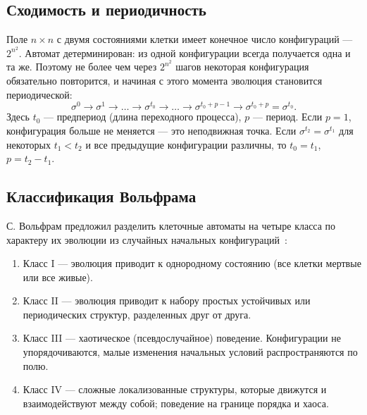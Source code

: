 \subsection{Сходимость и периодичность}
\label{sec:period}

Поле $n \times n$ с двумя состояниями клетки имеет конечное число конфигураций --- $2^{n^2}$. Автомат детерминирован: из одной конфигурации всегда получается одна и та же. Поэтому не более чем через $2^{n^2}$ шагов некоторая конфигурация обязательно повторится, и начиная с этого момента эволюция становится периодической:
\[
	\sigma^0 \to \sigma^1 \to \dots \to \sigma^{t_0} \to \dots \to \sigma^{t_0 + p - 1} \to \sigma^{t_0 + p} = \sigma^{t_0}.
\]
Здесь $t_0$ --- предпериод (длина переходного процесса), $p$ --- период. Если $p = 1$, конфигурация больше не меняется --- это неподвижная точка. Если $\sigma^{t_2} = \sigma^{t_1}$ для некоторых $t_1 < t_2$ и все предыдущие конфигурации различны, то $t_0 = t_1$, $p = t_2 - t_1$.

\subsection{Классификация Вольфрама}

С. Вольфрам предложил разделить клеточные автоматы на четыре класса по характеру их эволюции из случайных начальных конфигураций~\cite{wolfram1984}:
\begin{enumerate}
	\item {Класс I} --- эволюция приводит к однородному состоянию (все клетки мертвые или все живые).
	\item {Класс II} --- эволюция приводит к набору простых устойчивых или периодических структур, разделенных друг от друга.
	\item {Класс III} --- хаотическое (псевдослучайное) поведение. Конфигурации не упорядочиваются, малые изменения начальных условий распространяются по полю.
	\item {Класс IV} --- сложные локализованные структуры, которые движутся и взаимодействуют между собой; поведение на границе порядка и хаоса.
\end{enumerate}
